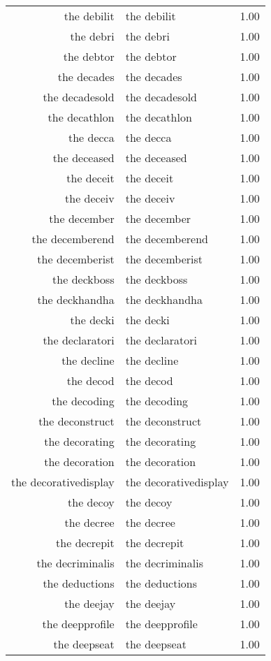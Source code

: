 \begin{table}[ht]
\begin{tabular}{rlr}
  the debilit & the debilit & 1.00 \\ 
  the debri & the debri & 1.00 \\ 
  the debtor & the debtor & 1.00 \\ 
  the decades & the decades & 1.00 \\ 
  the decadesold & the decadesold & 1.00 \\ 
  the decathlon & the decathlon & 1.00 \\ 
  the decca & the decca & 1.00 \\ 
  the deceased & the deceased & 1.00 \\ 
  the deceit & the deceit & 1.00 \\ 
  the deceiv & the deceiv & 1.00 \\ 
  the december & the december & 1.00 \\ 
  the decemberend & the decemberend & 1.00 \\ 
  the decemberist & the decemberist & 1.00 \\ 
  the deckboss & the deckboss & 1.00 \\ 
  the deckhandha & the deckhandha & 1.00 \\ 
  the decki & the decki & 1.00 \\ 
  the declaratori & the declaratori & 1.00 \\ 
  the decline & the decline & 1.00 \\ 
  the decod & the decod & 1.00 \\ 
  the decoding & the decoding & 1.00 \\ 
  the deconstruct & the deconstruct & 1.00 \\ 
  the decorating & the decorating & 1.00 \\ 
  the decoration & the decoration & 1.00 \\ 
  the decorativedisplay & the decorativedisplay & 1.00 \\ 
  the decoy & the decoy & 1.00 \\ 
  the decree & the decree & 1.00 \\ 
  the decrepit & the decrepit & 1.00 \\ 
  the decriminalis & the decriminalis & 1.00 \\ 
  the deductions & the deductions & 1.00 \\ 
  the deejay & the deejay & 1.00 \\ 
  the deepprofile & the deepprofile & 1.00 \\ 
  the deepseat & the deepseat & 1.00 \\ 

\end{tabular}
\end{table}
